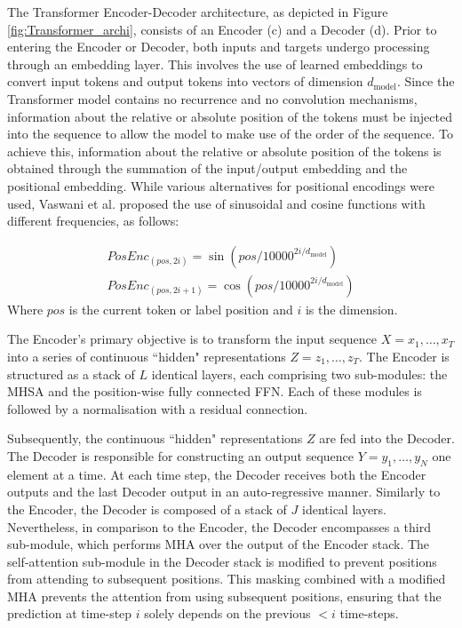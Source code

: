 The Transformer Encoder-Decoder architecture, as depicted in Figure \ref{fig:Transformer_archi}, consists of an Encoder (c) and a Decoder (d). Prior to entering the Encoder or Decoder, both inputs and targets undergo processing through an embedding layer. This involves the use of learned embeddings to convert input tokens and output tokens into vectors of dimension $d_{\text{model}}$. 
Since the Transformer model contains no recurrence and no convolution mechanisms, information about the relative or absolute position of the tokens must be injected into the sequence to allow the model to make use of the order of the sequence. To achieve this, information about the relative or absolute position of the tokens is obtained through the summation of the input/output embedding and the positional embedding. While various alternatives for positional encodings were used, Vaswani et al. \cite{vaswani2017attention} proposed the use of sinusoidal and cosine functions with different frequencies, as follows:

\begin{align}
    PosEnc_{(pos,2i)} = \sin(pos/10000^{2i/d_{\text{model}}})\\
    PosEnc_{(pos,2i+1)} = \cos(pos/10000^{2i/d_{\text{model}}})
\end{align}
Where $pos$ is the current token or label position and $i$ is the dimension.
 

The Encoder's primary objective is to transform the input sequence $X = x_1, \dots, x_T$ into a series of continuous ``hidden" representations $Z = z_1, \dots, z_T$. The Encoder is structured as a stack of $L$ identical layers, each comprising two sub-modules: the \ac{MHSA} and the position-wise fully connected \ac{FFN}. Each of these modules is followed by a normalisation with a residual connection.

Subsequently, the continuous ``hidden" representations $Z$ are fed into the Decoder. The Decoder is responsible for constructing an output sequence $Y = y_1, \dots, y_N$ one element at a time. At each time step, the Decoder receives both the Encoder outputs and the last Decoder output in an auto-regressive manner. Similarly to the Encoder, the Decoder is composed of a stack of $J$ identical layers. Nevertheless, in comparison to the Encoder, the Decoder encompasses a third sub-module, which performs \ac{MHA} over the output of the Encoder stack. The self-attention sub-module in the Decoder stack is modified to prevent positions from attending to subsequent positions. This masking combined with a modified \ac{MHA} prevents the attention from using subsequent positions, ensuring that the prediction at time-step $i$ solely depends on the previous $< i$ time-steps.

